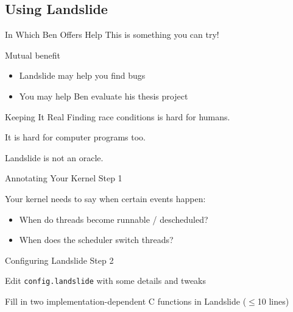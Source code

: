 \documentclass[xcolor=dvipsnames]{beamer}
\begin{document}

\subsection{Using Landslide}


\begin{frame}{In Which Ben Offers Help}
	This is something you can try!
	\linegap

	Mutual benefit
	\begin{itemize}
		\item Landslide may help you find bugs
		\item You may help Ben evaluate his thesis project
	\end{itemize}
\end{frame}

\begin{frame}{Keeping It Real}
	Finding race conditions is hard for humans.

	\linegap
	It is hard for computer programs too.

	\linegap
	Landslide is not an oracle.
\end{frame}

\begin{frame}{Annotating Your Kernel}
	Step 1
	\begin{center}
	\end{center}
	Your kernel needs to say when certain events happen:
	\begin{itemize}
		\item When do threads become runnable / descheduled?
		\item When does the scheduler switch threads?
	\end{itemize}
	\linegap

\end{frame}

\begin{frame}{Configuring Landslide}
	Step 2
	\begin{center}
	\end{center}
	Edit \texttt{config.landslide} with some details and tweaks

	Fill in two implementation-dependent C functions in Landslide ($\le$10 lines)
	\linegap

\end{frame}
\end{document}
